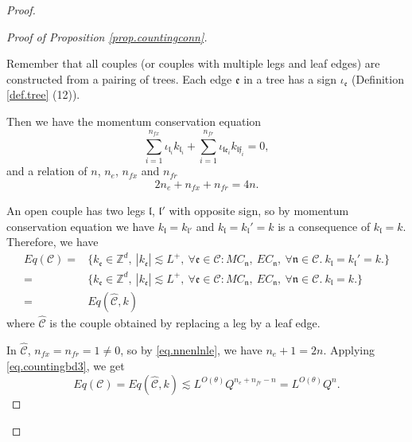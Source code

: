 \begin{proof}
\begin{proof}[Proof of Proposition \ref{prop.countingconn}]
\begin{lem}
Remember that all couples (or couples with multiple legs and leaf edges) are constructed from a pairing of trees. Each edge $\mathfrak{e}$ in a tree has a sign $\iota_{\mathfrak{e}}$ (Definition \ref{def.tree} (12)).  

Then we have the momentum conservation equation
\begin{equation}\label{eq.momentumconservation}
    \sum_{i=1}^{n_{\textit{fx}}} \iota_{\mathfrak{l}_i}k_{\mathfrak{l}_i}+\sum^{n_{\textit{fr}}}_{i=1}\iota_{\mathfrak{l}\mathfrak{e}_i}k_{\mathfrak{l}\mathfrak{f}_i}=0,
\end{equation}
and a relation of $n$, $n_e$, $n_{\textit{fx}}$ and $n_{\textit{fr}}$
\begin{equation}\label{eq.nnenlnle}
    2n_e+n_{\textit{fx}}+n_{\textit{fr}}=4n.
\end{equation}

\end{lem}

An open couple has two legs $\mathfrak{l}$, $\mathfrak{l}'$ with opposite sign, so by momentum conservation equation we have $k_{\mathfrak{l}}=k_{\mathfrak{l}'}$ and $k_{\mathfrak{l}}=k_{\mathfrak{l}}'=k$ is a consequence of $k_{\mathfrak{l}}=k$. Therefore, we have 
\begin{equation}\label{eq.stephatC}
\begin{split}
    Eq(\mathcal{C})=&\{k_{\mathfrak{e}}\in \mathbb{Z}^d,\ |k_{\mathfrak{e}}| \lesssim L^+,\ \forall \mathfrak{e}\in \mathcal{C}:MC_{\mathfrak{n}},\  EC_{\mathfrak{n}},\ \forall \mathfrak{n}\in \mathcal{C}.\ k_{\mathfrak{l}}=k_{\mathfrak{l}}'=k.\}  
    \\
    =& \{k_{\mathfrak{e}}\in \mathbb{Z}^d,\ |k_{\mathfrak{e}}| \lesssim L^+,\ \forall \mathfrak{e}\in \mathcal{C}:MC_{\mathfrak{n}},\  EC_{\mathfrak{n}},\ \forall \mathfrak{n}\in \mathcal{C}.\ k_{\mathfrak{l}}=k.\}  
    \\
    =&Eq(\widehat{\mathcal{C}},k)
\end{split}
\end{equation}
where $\widehat{\mathcal{C}}$ is the couple obtained by replacing a leg by a leaf edge.

In $\widehat{\mathcal{C}}$, $n_{\textit{fx}}=n_{\textit{fr}}=1\ne 0$, so by \eqref{eq.nnenlnle}, we have $n_e+1=2n$. Applying \eqref{eq.countingbd3}, we get
\begin{equation}\label{eq.stephatC'}
    Eq(\mathcal{C})=Eq(\widehat{\mathcal{C}},k)\lesssim L^{O(\theta)} Q^{n_e+n_{\textit{fr}}-n} = L^{O(\theta)} Q^{n}.
\end{equation}


\end{proof}
\end{proof}

